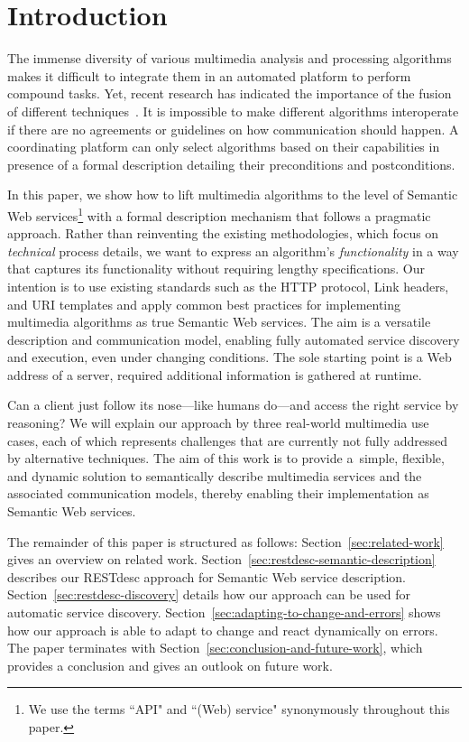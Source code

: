 \documentclass[smallextended]{svjour3}
\begin{document}
\section{Introduction} \label{sec:introduction}
The immense diversity of various multimedia analysis and processing algorithms makes it difficult to integrate them in an automated platform to perform compound tasks. Yet, recent research has indicated the importance of the fusion of different techniques~\cite{Atrey:2010p3072}. It is impossible to make different algorithms interoperate if there are no agreements or guidelines on how communication should happen. A coordinating platform can only select algorithms based on their capabilities in presence of a formal description detailing their preconditions and postconditions.

In this paper, we show how to lift multimedia algorithms to the level of Semantic Web services\footnote{We use the terms ``API" and ``(Web) service" synonymously throughout this paper.} with a formal description mechanism that follows a pragmatic approach. Rather than reinventing the existing methodologies, which focus on \emph{technical} process details, we want to express an algorithm's \emph{functionality} in a way that captures its functionality without requiring lengthy specifications. Our intention is to use existing standards such as the HTTP protocol, Link headers, and URI templates and apply common best practices for implementing multimedia algorithms as true Semantic Web services. The aim is a versatile description and communication model, enabling fully automated service discovery and execution, even under changing conditions. The sole starting point is a Web address of a server, required additional information is gathered at runtime.

Can a client just follow its nose---like humans do---and access the right service by reasoning? We will explain our approach by three real-world multimedia use cases, each of which represents challenges that are currently not fully addressed by alternative techniques.
The aim of this work is to provide a~simple, flexible, and dynamic solution to semantically describe multimedia services and the associated communication models, thereby enabling their implementation as Semantic Web services.

The remainder of this paper is structured as follows: Section~\ref{sec:related-work} gives an overview on related work. Section~\ref{sec:restdesc-semantic-description} describes our RESTdesc approach for Semantic Web service description. Section~\ref{sec:restdesc-discovery} details how our approach can be used for automatic service discovery. Section~\ref{sec:adapting-to-change-and-errors} shows how our approach is able to adapt to change and react dynamically on errors. The paper terminates with Section~\ref{sec:conclusion-and-future-work}, which provides a conclusion and gives an outlook on future work.
\end{document}
